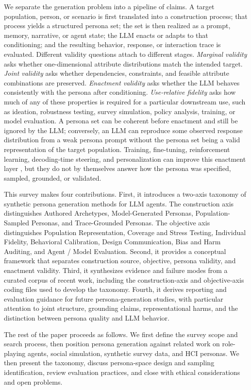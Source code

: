 We separate the generation problem into a pipeline of claims. A target
population, person, or scenario is first translated into a construction process;
that process yields a structured persona set; the set is then realized as a
prompt, memory, narrative, or agent state; the LLM enacts or adapts to that
conditioning; and the resulting behavior, response, or interaction trace is
evaluated. Different validity questions attach to different stages.
\emph{Marginal validity} asks
whether one-dimensional attribute distributions match the intended target.
\emph{Joint validity} asks whether dependencies, constraints, and feasible
attribute combinations are preserved. \emph{Enactment validity} asks whether the
LLM behaves consistently with the persona after conditioning. \emph{Use-relative
fidelity} asks how much of any of these properties is required for a particular
downstream use, such as ideation, robustness testing, survey simulation, policy
analysis, training, or model evaluation. A persona set can be coherent before
enactment and still be ignored by the LLM; conversely, an LLM can reproduce some
observed response distribution from a weak persona prompt without the persona
set being a valid representation of the target population. Training,
fine-tuning, reinforcement learning, decoding-time steering, and personalization
can improve this enactment layer \citep{arxiv250115427,arxiv231104978,arxiv250214289},
but they do not by themselves answer how the persona was specified, sampled,
grounded, or validated.

This survey makes four contributions. First, it introduces a two-axis taxonomy
of synthetic persona generation methods for LLM agents. The construction axis
distinguishes Authored Archetypes, Model-Generated Personas, Population-Sampled
Personas, and Trace-Grounded Personas. The objective axis distinguishes
Population Representation, Coverage and Stress Testing, Individual Fidelity,
Behavioral Calibration, Design Communication, Bias and Harm Auditing, and Agent
/ Model Evaluation. Second, it provides a conceptual framework that separates
construction source, objective, persona validity, and enactment validity. Third,
it synthesizes evidence and failure modes from a curated corpus of recent work,
including the construction-axis and objective-axis coding files used to develop
the taxonomy. Fourth, it derives reporting and evaluation guidance for future
persona-generation studies, with particular attention to joint structure,
grounding claims, representational harms, and the distinction between persona
quality and LLM behavior.

The rest of the paper proceeds as follows. We first define the survey scope and
search process, then position persona generation against related work on
role-playing agents, social simulation, synthetic survey data, and HCI personas.
We then present the taxonomy, discuss persona-space design and sampling
identification, review evaluation practices, and close with ethical
considerations and open problems.
